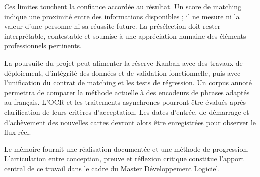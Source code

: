 Ces limites touchent la confiance accordée au résultat. Un score de matching indique une proximité entre des informations disponibles ; il ne mesure ni la valeur d'une personne ni sa réussite future. La présélection doit rester interprétable, contestable et soumise à une appréciation humaine des éléments professionnels pertinents.

La poursuite du projet peut alimenter la réserve Kanban avec des travaux de déploiement, d'intégrité des données et de validation fonctionnelle, puis avec l'unification du contrat de matching et les tests de régression. Un corpus annoté permettra de comparer la méthode actuelle à des encodeurs de phrases adaptés au français. L'OCR et les traitements asynchrones pourront être évalués après clarification de leurs critères d'acceptation. Les dates d'entrée, de démarrage et d'achèvement des nouvelles cartes devront alors être enregistrées pour observer le flux réel.

Le mémoire fournit une réalisation documentée et une méthode de progression. L'articulation entre conception, preuve et réflexion critique constitue l'apport central de ce travail dans le cadre du Master Développement Logiciel.
